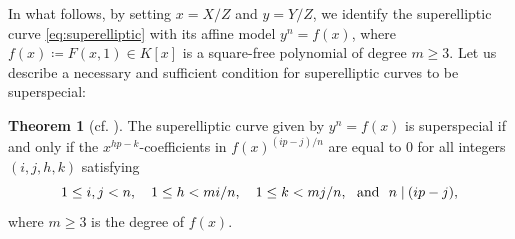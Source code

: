 \documentclass{article}
\theoremstyle{definition}
\newtheorem{Thm}[Def]{Theorem}
\newtheorem{Exp}[Def]{Example}
\begin{document}
In what follows, by setting $x = X/Z$ and $y = Y/Z$, we identify the superelliptic curve \eqref{eq:superelliptic} with its affine model $y^n = f(x)$, where $f(x) \coloneqq F(x,1) \in K[x]$ is a square-free polynomial of degree $m \geq 3$.
Let us describe a necessary and sufficient condition for superelliptic curves to be superspecial:\vspace{-1.2mm}
\begin{Thm}[{cf. \cite[Theorem 2.15]{Brock}}]\label{thm:superelliptic}
The superelliptic curve given by $y^n = f(x)$ is superspecial if and only if the $x^{hp-k}$-coefficients in $f(x)^{(ip-j)/n}$ are equal to $0$ for all integers $(i,j,h,k)$ satisfying\vspace{-1.3mm}
\[
    1 \leq i,j < n, \quad 1 \leq h < mi/n, \quad 1 \leq k < mj/n,\ \text{ and }\ n \mid\hspace{-0.2mm} (ip-j),\vspace{-0.1mm}
\]
where $m \geq 3$ is the degree of $f(x)$.
\end{Thm}
\end{document}
